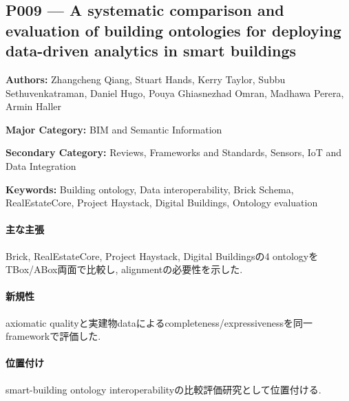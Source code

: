 \subsection{P009 --- A systematic comparison and evaluation of building ontologies for deploying data-driven analytics in smart buildings}
\label{paper:P009}
\textbf{Authors:} Zhangcheng Qiang, Stuart Hands, Kerry Taylor, Subbu Sethuvenkatraman, Daniel Hugo, Pouya Ghiasnezhad Omran, Madhawa Perera, Armin Haller\par
\textbf{Major Category:} BIM and Semantic Information\par
\textbf{Secondary Category:} Reviews, Frameworks and Standards, Sensors, IoT and Data Integration\par
\textbf{Keywords:} Building ontology, Data interoperability, Brick Schema, RealEstateCore, Project Haystack, Digital Buildings, Ontology evaluation\par
\paragraph{主な主張}
Brick, RealEstateCore, Project Haystack, Digital Buildingsの4 ontologyをTBox/ABox両面で比較し, alignmentの必要性を示した. \cite{Qiang:2023BuildingOntologies}
\paragraph{新規性}
axiomatic qualityと実建物dataによるcompleteness/expressivenessを同一frameworkで評価した.
\paragraph{位置付け}
smart-building ontology interoperabilityの比較評価研究として位置付ける.
